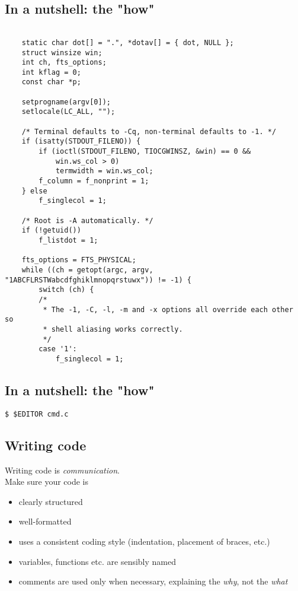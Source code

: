 \documentclass[sxga]{xdvislides}
\begin{document}
\subsection{In a nutshell: the "how"}
\small
\begin{verbatim}

    static char dot[] = ".", *dotav[] = { dot, NULL };
    struct winsize win;
    int ch, fts_options;
    int kflag = 0;
    const char *p;

    setprogname(argv[0]);
    setlocale(LC_ALL, "");

    /* Terminal defaults to -Cq, non-terminal defaults to -1. */
    if (isatty(STDOUT_FILENO)) {
        if (ioctl(STDOUT_FILENO, TIOCGWINSZ, &win) == 0 &&
            win.ws_col > 0)
            termwidth = win.ws_col;
        f_column = f_nonprint = 1;
    } else
        f_singlecol = 1;

    /* Root is -A automatically. */
    if (!getuid())
        f_listdot = 1;

    fts_options = FTS_PHYSICAL;
    while ((ch = getopt(argc, argv, "1ABCFLRSTWabcdfghiklmnopqrstuwx")) != -1) {
        switch (ch) {
        /*
         * The -1, -C, -l, -m and -x options all override each other so
         * shell aliasing works correctly.
         */
        case '1':
            f_singlecol = 1;
\end{verbatim}
\Normalsize

\subsection{In a nutshell: the "how"}
\begin{verbatim}
$ $EDITOR cmd.c
\end{verbatim}

\subsection{Writing code}
Writing code is {\em communication}. \\

Make sure your code is
\begin{itemize}
	\item clearly structured
	\item well-formatted
	\item uses a consistent coding style (indentation, placement of braces, etc.)
	\item variables, functions etc. are sensibly named
	\item comments are used only when necessary, explaining the {\em why}, not the {\em what}
\end{itemize}
\addvspace{.5in}
\end{document}
